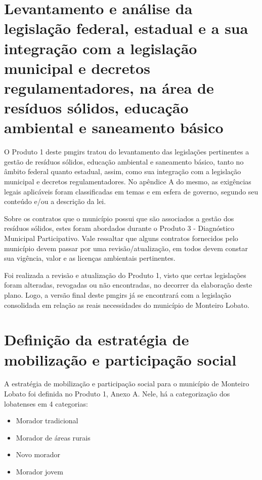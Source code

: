 \section{Levantamento e análise da legislação federal, estadual e a sua integração com a legislação municipal e decretos regulamentadores, na área de resíduos sólidos, educação ambiental e saneamento básico}
\label{sec:legislacao}

O Produto 1 deste \gls{pmgirs} tratou do levantamento das legislações pertinentes a gestão de resíduos sólidos, educação ambiental e saneamento básico, tanto no âmbito federal quanto estadual, assim, como sua integração com a legislação municipal e decretos regulamentadores. No apêndice A do mesmo, as exigências legais aplicáveis foram classificadas em temas e em esfera de governo, segundo seu conteúdo e/ou a descrição da lei.

Sobre os contratos que o município possui que são associados a gestão dos resíduos sólidos, estes foram abordados durante o Produto 3 - Diagnóstico Municipal Participativo. Vale ressaltar que alguns contratos fornecidos pelo município devem passar por uma revisão/atualização, em todos devem constar sua vigência, valor e as licenças ambientais pertinentes.

Foi realizada a revisão e atualização do Produto 1, visto que certas legislações foram alteradas, revogadas ou não encontradas, no decorrer da elaboração deste plano. Logo, a versão final deste \gls{pmgirs} já se encontrará com a legislação consolidada em relação as reais necessidades do município de Monteiro Lobato.  

\FloatBarrier
\newpage
\section{Definição da estratégia de mobilização e participação social}
\label{sec:mobiliz_social}

A estratégia de mobilização e participação social para o município de Monteiro Lobato foi definida no Produto 1, Anexo A. Nele, há a categorização dos lobatenses em 4 categorias:

\begin{itemize}
	\item Morador tradicional
	\item Morador de áreas rurais
	\item Novo morador
	\item Morador jovem
\end{itemize}

